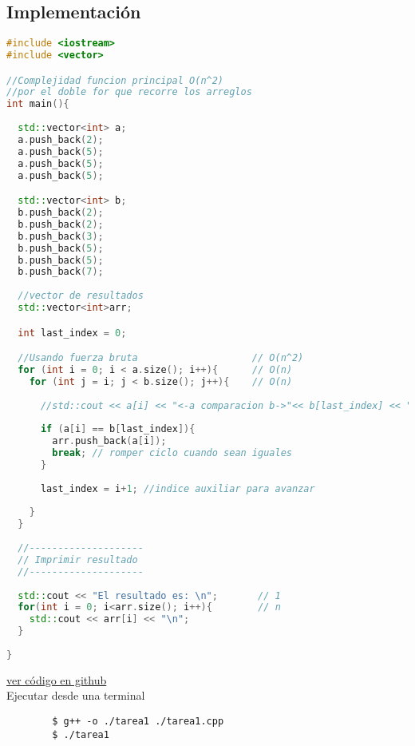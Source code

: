 \documentclass{article}
\begin{document}
\subsection{Implementación}
\begin{file}
\begin{lstlisting}[language=C++]
#include <iostream>
#include <vector>

//Complejidad funcion principal O(n^2)
//por el doble for que recorre los arreglos
int main(){
  
  std::vector<int> a;
  a.push_back(2);
  a.push_back(5);
  a.push_back(5);
  a.push_back(5);

  std::vector<int> b;
  b.push_back(2);
  b.push_back(2);
  b.push_back(3);
  b.push_back(5);
  b.push_back(5);
  b.push_back(7);
  
  //vector de resultados
  std::vector<int>arr;

  int last_index = 0;

  //Usando fuerza bruta                    // O(n^2)
  for (int i = 0; i < a.size(); i++){      // O(n)
    for (int j = i; j < b.size(); j++){    // O(n)
      
      //std::cout << a[i] << "<-a comparacion b->"<< b[last_index] << "\n";
      
      if (a[i] == b[last_index]){
        arr.push_back(a[i]);
        break; // romper ciclo cuando sean iguales
      }
      
      last_index = i+1; //indice auxiliar para avanzar 
      
    }
  }
  
  //--------------------
  // Imprimir resultado
  //--------------------
  
  std::cout << "El resultado es: \n";       // 1
  for(int i = 0; i<arr.size(); i++){        // n
    std::cout << arr[i] << "\n";
  }
  
}

\end{lstlisting}
\end{file}
\href{https://github.com/luisballado/ADA/blob/main/practice_code/tarea1.cpp}{ver código en github}\\

Ejecutar desde una terminal

\begin{commandline}
	\begin{verbatim}
		$ g++ -o ./tarea1 ./tarea1.cpp
		$ ./tarea1
	\end{verbatim}
\end{commandline}
\end{document}
